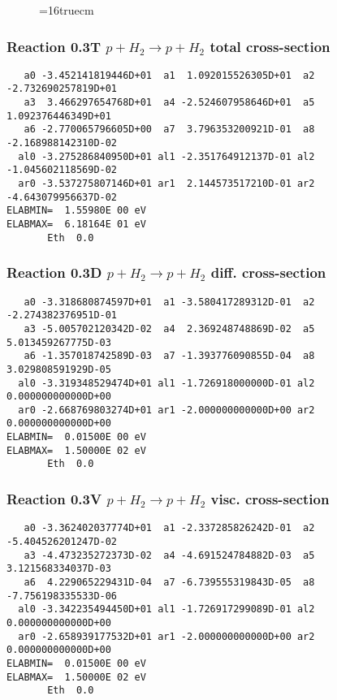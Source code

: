 \documentclass[12pt,dvipdfmx]{article}
\begin{document}
\begin{figure} \label{0.2}
\epsfxsize=16truecm
\end{figure}
\newpage

\subsubsection{
Reaction 0.3T    $p + H_2 \rightarrow p + H_2 $  total cross-section
}
\begin{small}\begin{verbatim}
   a0 -3.452141819446D+01  a1  1.092015526305D+01  a2 -2.732690257819D+01
   a3  3.466297654768D+01  a4 -2.524607958646D+01  a5  1.092376446349D+01
   a6 -2.770065796605D+00  a7  3.796353200921D-01  a8 -2.168988142310D-02
  al0 -3.275286840950D+01 al1 -2.351764912137D-01 al2 -1.045602118569D-02
  ar0 -3.537275807146D+01 ar1  2.144573517210D-01 ar2 -4.643079956637D-02
ELABMIN=  1.55980E 00 eV
ELABMAX=  6.18164E 01 eV
       Eth  0.0
\end{verbatim}\end{small}

\subsubsection{
Reaction 0.3D   $ p + H_2 \rightarrow p + H_2 $  diff. cross-section
}
\begin{small}\begin{verbatim}
   a0 -3.318680874597D+01  a1 -3.580417289312D-01  a2 -2.274382376951D-01
   a3 -5.005702120342D-02  a4  2.369248748869D-02  a5  5.013459267775D-03
   a6 -1.357018742589D-03  a7 -1.393776090855D-04  a8  3.029808591929D-05
  al0 -3.319348529474D+01 al1 -1.726918000000D-01 al2  0.000000000000D+00
  ar0 -2.668769803274D+01 ar1 -2.000000000000D+00 ar2  0.000000000000D+00
ELABMIN=  0.01500E 00 eV
ELABMAX=  1.50000E 02 eV
       Eth  0.0
\end{verbatim}\end{small}

\subsubsection{
Reaction 0.3V   $  p + H_2 \rightarrow p + H_2  $ visc. cross-section
}
\begin{small}\begin{verbatim}
   a0 -3.362402037774D+01  a1 -2.337285826242D-01  a2 -5.404526201247D-02
   a3 -4.473235272373D-02  a4 -4.691524784882D-03  a5  3.121568334037D-03
   a6  4.229065229431D-04  a7 -6.739555319843D-05  a8 -7.756198335533D-06
  al0 -3.342235494450D+01 al1 -1.726917299089D-01 al2  0.000000000000D+00
  ar0 -2.658939177532D+01 ar1 -2.000000000000D+00 ar2  0.000000000000D+00
ELABMIN=  0.01500E 00 eV
ELABMAX=  1.50000E 02 eV
       Eth  0.0
\end{verbatim}\end{small}
\end{document}
